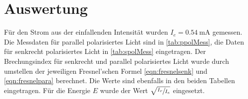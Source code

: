 \section{Auswertung}
\label{sec:Auswertung}

Für den Strom aus der einfallenden Intensität wurden $I_e = \SI{0,54}{\milli\ampere}$ gemessen. Die Messdaten für parallel polarisiertes Licht sind in
\autoref{tab:ppolMess}, die Daten für senkrecht polarisiertes Licht in \autoref{tab:spolMess} eingetragen. Der Brechungsindex für senkrecht und parallel
polarisiertes Licht wurde durch umstellen der jeweiligen Fresnel'schen Formel \eqref{eqn:fresnelsenk} und \eqref{eqn:fresnelpara} berechnet. Die Werte sind ebenfalls in den beiden Tabellen eingetragen.
Für die Energie $E$ wurde der Wert $\sqrt{\sfrac{I_r}{I_e}}$ eingesetzt.



